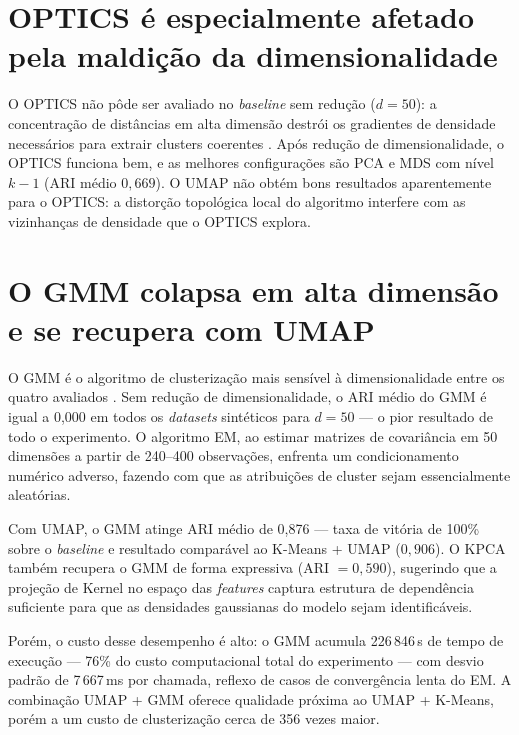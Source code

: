 \documentclass[12pt,a4paper]{report}
\begin{document}
\section*{OPTICS é especialmente afetado pela maldição da dimensionalidade}

O OPTICS não pôde ser avaliado no \textit{baseline} sem redução ($d = 50$):
a concentração de distâncias em alta dimensão destrói os gradientes de
densidade necessários para extrair clusters coerentes \citep{beyer1999,kriegel2009}. Após redução de
dimensionalidade, o OPTICS funciona bem, e as melhores configurações são PCA
e MDS com nível $k-1$ (ARI médio $0{,}669$). O UMAP não obtém bons
resultados aparentemente para o OPTICS: a distorção topológica local do
algoritmo interfere com as vizinhanças de densidade que o OPTICS explora.

\section*{O GMM colapsa em alta dimensão e se recupera com UMAP}
\label{sec:gmm}

O GMM é o algoritmo de clusterização mais sensível à dimensionalidade entre
os quatro avaliados \citep{bouveyron2007}. Sem redução de dimensionalidade, o ARI médio do GMM é
igual a 0{,}000 em todos os \textit{datasets} sintéticos para $d = 50$ --- o
pior resultado de todo o experimento. O algoritmo EM, ao estimar matrizes de
covariância em 50 dimensões a partir de 240--400 observações, enfrenta um
condicionamento numérico adverso, fazendo com que as atribuições de cluster
sejam essencialmente aleatórias.

Com UMAP, o GMM atinge ARI médio de 0{,}876 --- taxa de vitória de
100\% sobre o \textit{baseline} e resultado comparável ao K-Means + UMAP
($0{,}906$). O KPCA também recupera o GMM de forma expressiva (ARI
$= 0{,}590$), sugerindo que a projeção de Kernel no espaço das
\textit{features} captura estrutura de dependência suficiente para que as
densidades gaussianas do modelo sejam identificáveis.

Porém, o custo desse desempenho é alto: o GMM acumula 226\,846\,s de tempo
de execução --- 76\% do custo computacional total do experimento --- com
desvio padrão de 7\,667\,ms por chamada, reflexo de casos de convergência
lenta do EM. A combinação UMAP + GMM oferece qualidade próxima ao
UMAP + K-Means, porém a um custo de clusterização cerca de 356 vezes maior.
\end{document}
